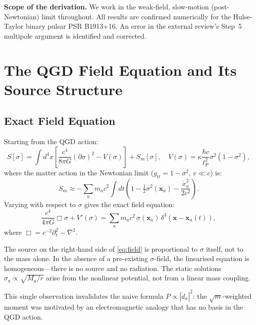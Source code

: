 \documentclass[12pt,a4paper]{article}
\newcommand{\lP}{\ell_{\mathrm{P}}}
\begin{document}
\medskip\noindent
\textbf{Scope of the derivation.}
We work in the weak-field, slow-motion (post-Newtonian) limit throughout.
All results are confirmed numerically for the Hulse-Taylor binary pulsar
PSR B1913+16. An error in the external review's Step~5 multipole argument
is identified and corrected.

\section{The QGD Field Equation and Its Source Structure}

\subsection{Exact Field Equation}

Starting from the QGD action:
\begin{equation}
  S[\sigma] = \int d^4x\left[\frac{c^4}{8\pi G}(\partial\sigma)^2
    - V(\sigma)\right] + S_m[\sigma],
  \quad
  V(\sigma) = \kappa\frac{\hbar c}{\lP^2}\sigma^2(1-\sigma^2),
\end{equation}
where the matter action in the Newtonian limit ($g_{tt} = 1-\sigma^2$,
$v\ll c$) is:
\begin{equation}
  S_m \approx -\sum_a m_a c^2 \int dt
  \left(1 - \tfrac{1}{2}\sigma^2(\mathbf{x}_a) - \frac{\dot{x}_a^2}{2c^2}\right).
\end{equation}
Varying with respect to $\sigma$ gives the exact field equation:
\begin{equation}
  \boxed{\frac{c^4}{4\pi G}\Box\sigma + V'(\sigma)
  = \sum_a m_a c^2\,\sigma(\mathbf{x}_a)\,\delta^3(\mathbf{x}-\mathbf{x}_a(t)),}
  \label{eq:field}
\end{equation}
where $\Box = c^{-2}\partial_t^2 - \nabla^2$.

\begin{result}
The source on the right-hand side of \eqref{eq:field} is proportional to
$\sigma$ itself, not to the mass alone. In the absence of a pre-existing
$\sigma$-field, the linearised equation is homogeneous---there is no source
and no radiation. The static solutions $\sigma_a \propto \sqrt{M_a/r}$ arise
from the nonlinear potential, not from a linear mass coupling.
\end{result}

This single observation invalidates the naive formula $P\propto|\ddot{d}_\sigma|^2$:
the $\sqrt{m}$-weighted moment was motivated by an electromagnetic analogy
that has no basis in the QGD action.
\end{document}
